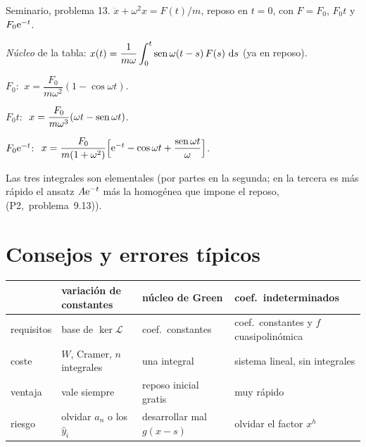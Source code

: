 \documentclass[11pt,twoside]{article}
\newcommand\Lop{\mathcal L}
\newcommand\yh{\hat y}
\newcommand\pII[1]{(P2,~#1)}
\begin{document}
\begin{problema}\label{prob:13}
Seminario, problema 13. $\ddot x+\omega^2x=F(t)/m$, reposo en $t=0$, con $F=F_0$, $F_0t$ y $F_0\mathrm{e}^{-t}$.
\end{problema}
\begin{resolucion}
\begin{pasos}
\item \emph{Núcleo} de la tabla: $x(t)=\dfrac1{m\omega}\displaystyle\int_0^t\operatorname{sen}\omega(t-s)\,F(s)\,\mathop{}\!\mathrm{d} s$ (ya en reposo).
\item $F_0$: $\ x=\dfrac{F_0}{m\omega^2}(1-\cos\omega t)$.
\item $F_0t$: $\ x=\dfrac{F_0}{m\omega^3}(\omega t-\operatorname{sen}\omega t)$.
\item $F_0\mathrm{e}^{-t}$: $\ x=\dfrac{F_0}{m(1+\omega^2)}\Big[\e^{-t}-\cos\omega t+\dfrac{\sen\omega t}{\omega}\Big]$.
\end{pasos}
Las tres integrales son elementales (por partes en la segunda; en la tercera es más rápido el ansatz $A\mathrm{e}^{-t}$ más la
homogénea que impone el reposo, \pII{problema~9.13}).
\end{resolucion}

\section{Consejos y errores típicos}\label{sec:consejos}

\begin{center}
\renewcommand\arraystretch{1.35}
\small
\begin{tabular}{@{}l p{3.9cm} p{3.9cm} p{3.6cm}@{}}
\toprule
& \textcolor{acc}{variación de constantes} & \textcolor{acc}{núcleo de Green} & \textcolor{acc}{coef.\ indeterminados}\\
\midrule
requisitos & base de $\ker\Lop$ & coef.\ constantes & coef.\ constantes y $f$ cuasipolinómica\\
coste & $W$, Cramer, $n$ integrales & una integral & sistema lineal, sin integrales\\
ventaja & vale siempre & reposo inicial gratis & muy rápido\\
riesgo & olvidar $a_n$ o los $\yh_i$ & desarrollar mal $g(x-s)$ & olvidar el factor $x^h$\\
\bottomrule
\end{tabular}
\end{center}
\end{document}
